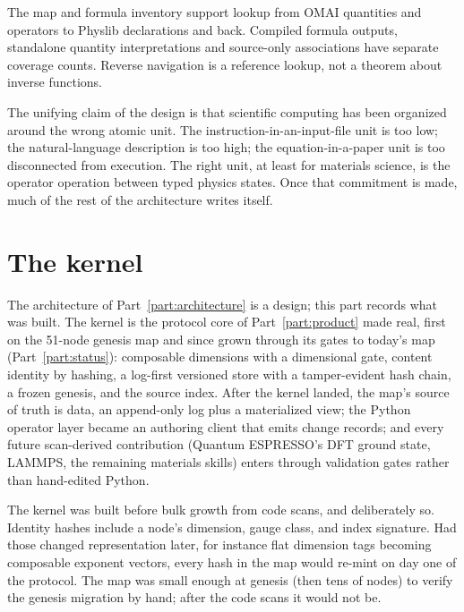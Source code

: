 \documentclass[11pt,a4paper]{article}
\begin{document}
The map and formula inventory support lookup from OMAI quantities and operators
to Physlib declarations and back. Compiled formula outputs, standalone quantity
interpretations and source-only associations have separate coverage counts.
Reverse navigation is a reference lookup, not a theorem about inverse functions.

The unifying claim of the design is that scientific computing has been organized around the
wrong atomic unit. The instruction-in-an-input-file unit is too low; the natural-language
description is too high; the equation-in-a-paper unit is too disconnected from execution. The
right unit, at least for materials science, is the operator operation between typed physics
states. Once that commitment is made, much of the rest of the architecture writes itself.

\part{The kernel}
\label{part:kernel}

\noindent
The architecture of Part~\ref{part:architecture} is a design; this part records
what was built. The kernel is the protocol core of Part~\ref{part:product} made
real, first on the 51-node genesis map and since grown through its gates to
today's map (Part~\ref{part:status}): composable dimensions with a dimensional
gate, content identity by hashing, a log-first versioned store with a
tamper-evident hash chain, a frozen genesis, and the source index. After the
kernel landed, the
map's source of truth is data, an append-only log plus a materialized view; the
Python operator layer became an authoring client that emits change records; and
every future scan-derived contribution (Quantum ESPRESSO's DFT ground state,
LAMMPS, the remaining materials skills) enters through validation gates rather
than hand-edited Python.

The kernel was built before bulk growth from code scans, and deliberately so.
Identity hashes include a node's dimension, gauge class, and index signature. Had
those changed representation later, for instance flat dimension tags becoming
composable exponent vectors, every hash in the map would re-mint on day one of
the protocol. The map was small enough at genesis (then tens of nodes) to
verify the genesis migration by hand; after the code scans it would not
be.
\end{document}
